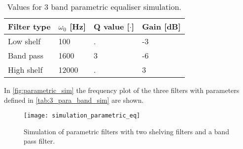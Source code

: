 \begin{table}[htbp]
\centering
\caption{Values for 3 band parametric equaliser simulation.}
\label{tab:3_para_band_sim}
\begin{tabular}{|l|l|l|l|}
\hline
Filter type & $\omega_0$ {[}Hz{]} & Q value {[}$\cdot${]} & Gain {[}dB{]} \\ \hline
Low shelf & 100 & . & -3 \\ \hline
Band pass & 1600  & 3& -6 \\ \hline
High shelf &12000 & . & 3 \\ \hline

\end{tabular}
\end{table}

In \autoref{fig:parametric_sim} the frequency plot of the three filters with parameters defined in \autoref{tab:3_para_band_sim} are shown.

\begin{figure}[htbp]
    \centering
    \texttt{[image: simulation\_parametric\_eq]}
    \caption{Simulation of parametric filters with two shelving filters and a band pass filter.}{
    \label{fig:parametric_sim}
    }
\end{figure}

